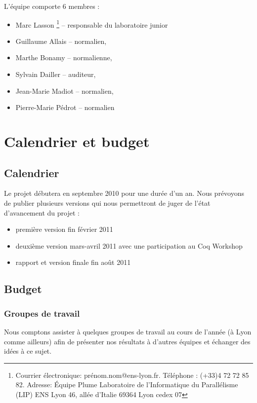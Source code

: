 \documentclass[11pt]{article}
\begin{document}
L'équipe comporte 6 membres :

\begin{itemize}
 \item Marc Lasson \footnote{Courrier électronique: prénom.nom@ens-lyon.fr.
    Téléphone : (+33)4 72 72 85 82.
    Adresse:
          Équipe Plume
          Laboratoire de l'Informatique du Parallélisme (LIP)
          ENS Lyon
          46, allée d'Italie
          69364 Lyon cedex 07
} -- responsable du laboratoire junior
 \item Guillaume Allais -- normalien,
 \item Marthe Bonamy -- normalienne,
 \item Sylvain Dailler -- auditeur,
 \item Jean-Marie Madiot -- normalien,
 \item Pierre-Marie Pédrot -- normalien
\end{itemize}

\section{Calendrier et budget}

\subsection{Calendrier}

Le projet débutera en septembre 2010 pour une durée d'un an.
Nous prévoyons de publier plusieurs versions qui nous permettront de juger de l'état d'avancement du projet : 
\begin{itemize}
 \item première version fin février 2011
 \item deuxième version mars-avril 2011 avec une participation au Coq Workshop
 \item rapport et version finale fin août 2011
\end{itemize}

\subsection{Budget}

\subsubsection{Groupes de travail}

Nous comptons assister à quelques groupes de travail au cours de l'année (à Lyon comme ailleurs) afin de présenter nos résultats à d'autres équipes et échanger des idées à ce sujet. 
\end{document}
